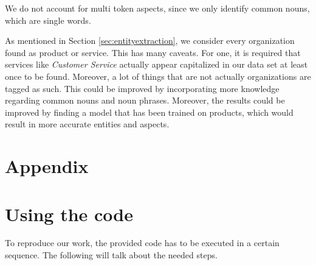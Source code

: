 \documentclass[10pt,a4paper]{article}
\begin{document}
	We do not account for multi token aspects, since we only identify common nouns, which are single words.

	As mentioned in Section \ref{sec:entityextraction}, we consider every organization found as product or service. This has many caveats. For one, it is required that services like \textit{Customer Service} actually appear capitalized in our data set at least once to be found. Moreover, a lot of things that are not actually organizations are tagged as such. This could be improved by incorporating more knowledge regarding common nouns and noun phrases.
	Moreover, the results could be improved by finding a model that has been trained on products, which would result in more accurate entities and aspects.
	
	
	\appendix
	
	\section*{Appendix}
			
	\section{Using the code}
		To reproduce our work, the provided code has to be executed in a certain sequence. The following will talk about the needed steps.

	\newpage
	
		
	
	
\end{document}
